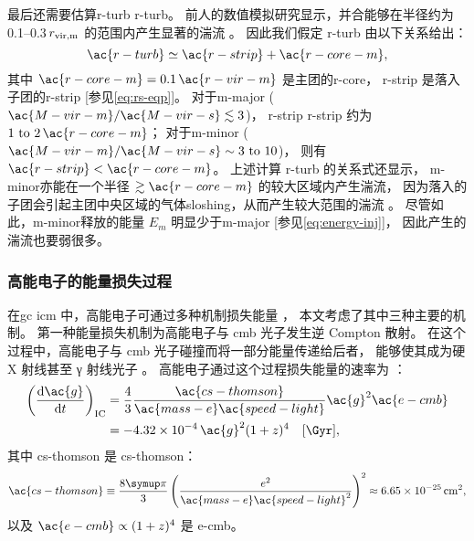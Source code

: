 最后还需要估算\acl{r-turb} \ac{r-turb}。
前人的数值模拟研究显示，并合能够在半径约为 \numrange{0.1}{0.3}$\,r_{\mathrm{vir,m}}$
的范围内产生显著的湍流 \cite{vazza2011,vazza2012,miniati2015ss}。
因此我们假定 \ac{r-turb} 由以下关系给出：
\begin{equation}
  \label{eq:r-turb}
  \ac{r-turb} \simeq \ac{r-strip} + \ac{r-core-m} ,
\end{equation}
其中
$\ac{r-core-m} = 0.1 \,\ac{r-vir-m}$ 是主团的\acl{r-core}，
\ac{r-strip} 是落入子团的\acl{r-strip} [参见\autoref{eq:rs-eqp}]。
对于\ac{m-major} ($\ac{M-vir-m} / \ac{M-vir-s} \lesssim 3$)，
\acl{r-strip} \ac{r-strip} 约为 $\numrange{1}{2} \,\ac{r-core-m}$；
对于\ac{m-minor} ($\ac{M-vir-m} / \ac{M-vir-s} \sim \numrange{3}{10}$)，
则有 $\ac{r-strip} < \ac{r-core-m}$。
上述计算 \ac{r-turb} 的关系式还显示，
\ac{m-minor}亦能在一个半径 $\gtrsim \ac{r-core-m}$ 的较大区域内产生湍流，
因为落入的子团会引起主团中央区域的气体\ac{sloshing}，从而产生较大范围的湍流
\cite{vazza2012}。
尽管如此，\ac{m-minor}释放的能量 $E_m$ 明显少于\ac{m-major}
[参见\autoref{eq:energy-inj}]，
因此产生的湍流也要弱很多。

\subsubsection{高能电子的能量损失过程}

在\ac{gc} \ac{icm} 中，高能电子可通过多种机制损失能量 \cite{sarazin1999}，
本文考虑了其中三种主要的机制。
第一种能量损失机制为高能电子与 \ac{cmb} 光子发生逆 Compton 散射。
在这个过程中，高能电子与 \ac{cmb} 光子碰撞而将一部分能量传递给后者，
能够使其成为硬 X 射线甚至 γ 射线光子 \cite{rybicki1979}。
高能电子通过这个过程损失能量的速率为 \cite{sarazin1999}：
\begin{align}
  \label{eq:eloss-ic}
  \left( \diff{\ac{g}}{t} \right)_{\R{IC}}
    & = \frac{4}{3} \frac{\ac{cs-thomson}}{\ac{mass-e} \ac{speed-light}}
        \ac{g}^2 \ac{e-cmb} \\
    & = \num{-4.32e-4} \,\ac{g}^2 (1+z)^4 \quad [\si{\per\Gyr}] ,
\end{align}
其中
\ac{cs-thomson} 是 \acl{cs-thomson}：
\begin{equation}
  \ac{cs-thomson} \equiv \frac{8\Cpi}{3}
      \left( \frac{e^2}{\ac{mass-e} \ac{speed-light}^2} \right)^2
    \approx \SI{6.65e-25}{\cm\squared} ,
\end{equation}
以及 $\ac{e-cmb} \propto (1+z)^4$ 是 \acl{e-cmb}。

